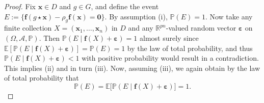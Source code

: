 \documentclass[10pt,a4paper]{amsart}
\newcommand{\R}{\mathbb{R}}
\newcommand{\bff}{\boldsymbol{f}}
\newcommand{\bx}{\boldsymbol{x}}
\begin{document}
\begin{proof}
Fix $\bx\in D$ and $g\in G$, and define the event $E:=\{\bff(g\star\bx)-\rho_g\bff(\bx)=\bm 0\}$. By assumption (i), $\mathbb{P}(E)=1$. Now take any finite collection $X = \left(\bx_{1},\dots,\bx_{n}\right)$ in $D$ and any $\R^{pn}$-valued random vector $\boldsymbol{\varepsilon}$ on $(\Omega, \mathcal{A}, \mathbb{P})$.
Then $\mathbb{P}(E\mid \bff(X)+\boldsymbol{\varepsilon})=1$ almost surely since $\mathbb{E}[\mathbb{P}(E\mid \bff(X)+\boldsymbol{\varepsilon})]=\mathbb{P}(E)=1$ by the law of total probability, and thus $\mathbb{P}(E\mid \bff(X)+\boldsymbol{\varepsilon})<1$ with positive probability would result in a contradiction. This implies (ii) and in turn (iii). Now, assuming (iii), we again obtain by the law of total probability that
\begin{equation}
\mathbb{P}(E)=\mathbb{E}\big[\mathbb{P}(E\mid \bff(X)+\boldsymbol{\varepsilon})\big]=1.
\end{equation}

\end{proof}
\end{document}

